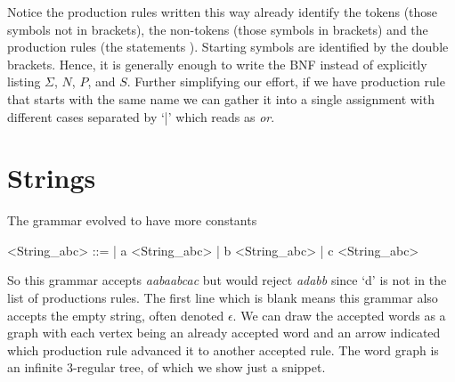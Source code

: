 Notice the production rules written this way already identify the 
tokens (those symbols not in brackets), the non-tokens (those symbols 
in brackets) and the production rules (the statements ).
Starting symbols are identified by the double brackets.  Hence,
it is generally enough to write the BNF instead of explicitly 
listing $\Sigma$, $N$, $P$, and $S$.  Further simplifying our effort,
if we have production rule that starts with the same name we 
can gather it into a single assignment with different cases 
separated by `|' which reads as \emph{or}.

\section{Strings}
The grammar evolved
to have more constants 
\begin{center}
\begin{Gcode}[]
<String_abc> ::=  
               | a <String_abc> 
               | b <String_abc>
               | c <String_abc> 
\end{Gcode}
\end{center}
So this grammar accepts \emph{aabaabcac} 
but would reject \emph{adabb} since `d' is not in the list of productions 
rules.  The first line which is blank means this grammar also accepts the 
empty string, often denoted 
$\epsilon$.  We can draw the accepted words as a graph with each vertex 
being an already accepted word and an arrow indicated which production rule 
advanced it to another accepted rule.  The word graph is an infinite 
3-regular tree, of which we show just a snippet.
\begin{center}
\end{center}
